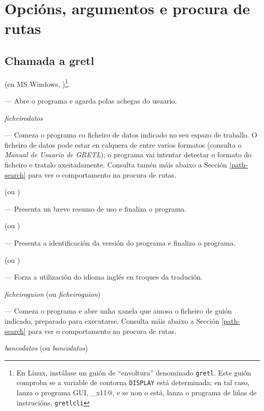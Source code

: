 \chapter{Opcións, argumentos e procura de rutas}
\label{optarg}

\section{Chamada a gretl}
\label{optarg1}

 (en MS Windows, )\footnote{En Linux,
  instálase un guión de ``envoltura'' denominado \texttt{gretl}. Este
  guión comproba se a variable de contorna \texttt{DISPLAY} está determinada;
  en tal caso, lanza o programa GUI, \verb@gretl_x11@, e se non o está,
  lanza o programa de liñas de instrucións, \texttt{gretlcli}}.

--- Abre o programa e agarda polas achegas do usuario.
      
 \textsl{ficheirodatos}
      
--- Comeza o programa co ficheiro de datos indicado no seu espazo de traballo.
O ficheiro de datos pode estar en calquera de entre varios formatos (consulta
o \emph{Manual de Usuario de GRETL}); o programa vai intentar detectar o
formato do ficheiro e tratalo axeitadamente. Consulta tamén máis abaixo a
Sección \ref{path-search} para ver o comportamento na procura de rutas.
      
 (ou )
      
--- Presenta un breve resumo de uso e finaliza o programa.
      
 (ou )
      
--- Presenta a identificación da versión do programa e finaliza o programa.
      
 (ou )
      
--- Forza a utilización do idioma inglés en troques da tradución.
      
 \textsl{ficheiroguion} (ou 
\textsl{ficheiroguion})
      
--- Comeza o programa e abre unha xanela que amosa o ficheiro de guión
indicado, preparado para executarse. Consulta máis abaixo a Sección
\ref{path-search} para ver o comportamento na procura de rutas.
      
 \textsl{bancodatos} (ou 
\textsl{bancodatos})

